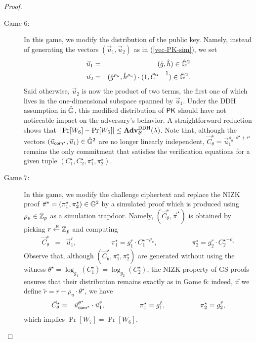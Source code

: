 \begin{proof}
\begin{description}
  \item[\textsf{Game} $6$:] In this game, we modify the distribution of the public key.  Namely, instead of generating 
    the vectors $(\vec{u}_1,\vec{u}_2)$ as in (\ref{vec-PK-sim}), we 
    set 
    \begin{eqnarray} \label{vec-PK-sim-bis} 
      \vec{u}_1 &=& (\hat{g}, \hat{h}) \in \hat{\mathbb{G}}^2  \\ \nonumber 
      \vec{u}_2 &=&  (\hat{g}^{\rho_u}, \hat{h}^{\rho_u}) \cdot (1,{\hat{C}^\star~}^{-1})  \in \hat{\mathbb{G}}^2.
    \end{eqnarray}
    Said otherwise,  $\vec{u}_2$ is now the product of two terms, the first one of which lives in the 
    one-dimensional subspace spanned by $\vec{u}_1$. Under the DDH assumption in $\hat{\mathbb{G}}$, this modified  
    distribution of $\mathsf{PK}$ should have not noticeable impact on the adversary's behavior.  
    A straightforward reduction shows 
    that $|\Pr[W_6]-\Pr[W_5] | \leq \mathbf{Adv}^{\mathrm{DDH}}_{\mathcal{B}} (\lambda)$. Note that, although the vectors $(\vec{u}_{\mathsf{com}^\star},\vec{u}_1) \in \hat{\mathbb{G}}^2$ are 
    no longer linearly independent, $\vec{C}_{\theta}^\star = \vec{u}_1^{\rho_u \cdot \theta^\star +r^\star}$ remains the only commitment 
    that satisfies the verification equations  for a given tuple $(C_1^\star,C_2^\star,\pi_1^\star,\pi_2^\star)$.
    

    \smallskip \smallskip 

  \item[\textsf{Game} $7$:] In this game, we  modify the challenge ciphertext and replace the NIZK proof $\vec{\pi}^\star=(\pi_1^\star,\pi_2^\star) \in \mathbb{G}^2$ by a simulated proof which is produced 
    using $\rho_u \in \mathbb{Z}_p$ as a simulation trapdoor. Namely, $(\vec{C}_\theta^\star,\vec{\pi}^\star)$ is obtained by picking $r \stackrel{{\scriptscriptstyle \mkern4mu R}}{\gets} \mathbb{Z}_p$ and  computing
    \begin{eqnarray*}
      \vec{C}_{\theta}^\star &=& \vec{u}_1^{r},   \qquad \qquad \quad
      \pi_1^\star  =  g_1^{r} \cdot {C_1^\star }^{-\rho_u} , \qquad \qquad \quad 
      \pi_2^\star  =  g_2^{r} \cdot {C_2^\star }^{-\rho_u}
    \end{eqnarray*}
    Observe that, although $(\vec{C}_\theta^\star,\pi_1^\star,\pi_2^\star)$ are generated without using the witness $\theta^\star = \log_{g_1}(C_1^\star) =
    \log_{g_2}(C_2^\star)$,  the NIZK property of 
    GS proofs ensures that 
    their distribution remains exactly as in Game $6$: indeed, if we define $\tilde{r} =r -\rho_u \cdot \theta^\star$, we have
    \begin{eqnarray*}
      \vec{C}_{\theta}^\star &=& \vec{u}_{\mathsf{com}^\star}^{\theta^\star} \cdot \vec{u}_1^{\tilde{r}},   \qquad \qquad \quad
      \pi_1^\star  =  g_1^{\tilde{r}} , \qquad \qquad \quad 
      \pi_2^\star  =  g_2^{\tilde{r}} ,
    \end{eqnarray*}
    which implies $\Pr[W_7]=\Pr[W_6]$.  
    \smallskip \smallskip



\end{description}
\end{proof}
